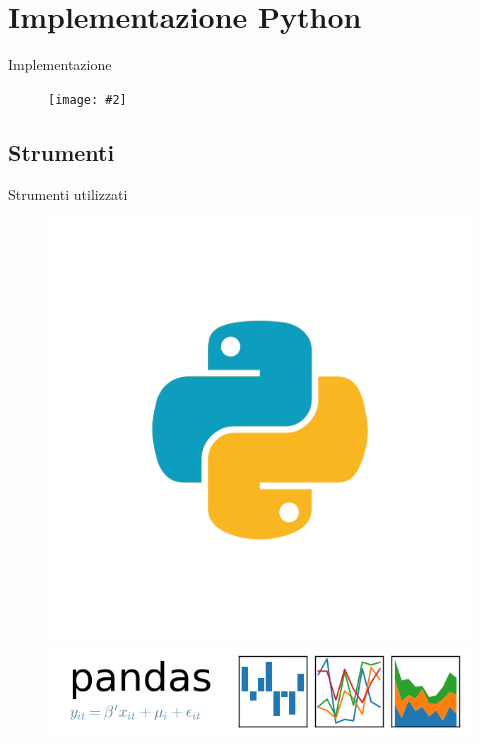 \documentclass[xcolor={dvipsnames}]{beamer}
\newcommand{\figcen}[2]{
	\begin{figure}
		\begin{center}
			\texttt{[image: \#2]}
		\end{center}
	\end{figure}
}
\begin{document}
\section{Implementazione Python}

	\begin{frame}{Implementazione}
		\figcen{.85\textwidth}{coding}
	\end{frame}

	\subsection{Strumenti}

		\begin{frame}{Strumenti utilizzati}
			\begin{figure}[htbp]
				\centering
				\begin{minipage}[c]{.35\textwidth}
					\centering\setlength{\captionmargin}{0pt}%
					\includegraphics[width=.9\textwidth]{python}
				\end{minipage}%
				\hspace{10mm}%
				\begin{minipage}[c]{.55\textwidth}
					\centering\setlength{\captionmargin}{0pt}%
					\includegraphics[width=\textwidth]{pandas}

\end{minipage}
\end{figure}
\end{frame}
\end{document}
